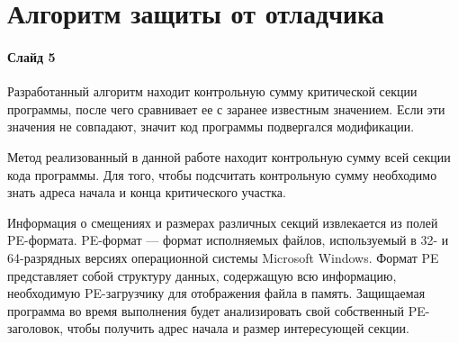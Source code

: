 
\section{Алгоритм защиты от отладчика}

\paragraph{Слайд 5}\mbox{}\par
Разработанный алгоритм находит контрольную сумму критической секции программы,
после чего сравнивает ее с заранее известным значением. Если эти значения не
совпадают, значит код программы подвергался модификации. 

Метод реализованный в данной работе находит контрольную сумму всей секции кода
программы. Для того, чтобы подсчитать контрольную сумму необходимо знать
адреса начала и конца критического участка.

Информация о смещениях и размерах различных секций извлекается из полей
PE-формата. PE-формат --- формат исполняемых файлов, используемый в 32- и
64-разрядных версиях операционной системы Microsoft Windows. Формат PE
представляет собой структуру данных, содержащую всю информацию, необходимую
PE-загрузчику для отображения файла в память. Защищаемая программа во время
выполнения будет анализировать свой собственный PE-заголовок, чтобы получить
адрес начала и размер интересующей секции.

